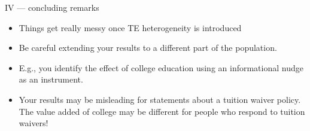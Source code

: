 \documentclass[notes=show,beamer,compress]{beamer}
\begin{document}
%	
%
%	
%
%
\begin{frame}{IV --- concluding remarks}
	
	\begin{itemize}
		\item Things get really messy once TE heterogeneity is introduced
		\item Be careful extending your results to a different part of the population.
		\item E.g., you identify the effect of college education using an informational nudge as an instrument. 
		\item
		Your results may be misleading for statements about a tuition waiver policy. The value added of college may be different for people who respond to tuition waivers! 
	\end{itemize}
	
\end{frame} 
\end{document}
